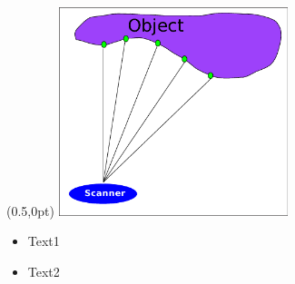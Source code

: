 \documentclass{beamer}
\begin{document}
	\begin{frame}
		\begin{textblock*}{0.5\textwidth}(0.5\textwidth,0pt)
			\includegraphics[width=0.5\textwidth]{Scanner}
		\end{textblock*}

		\begin{itemize}
			\item Text1\pause
			\item Text2
		\end{itemize}
	\end{frame}
\end{document}
